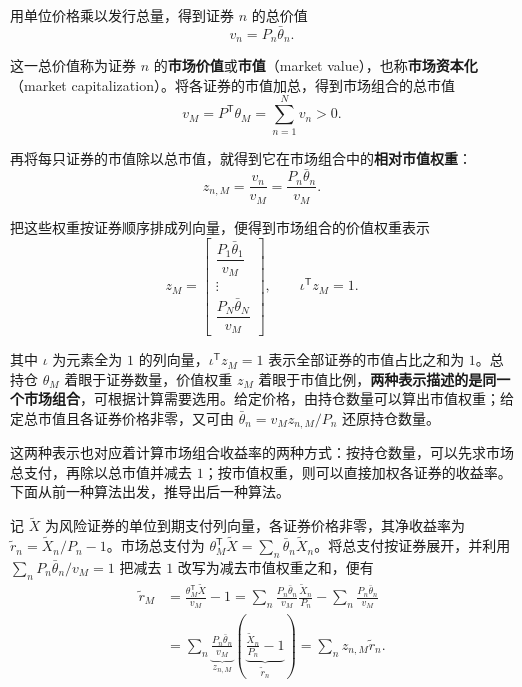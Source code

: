 \begin{tcolorbox}[knowledge]
用单位价格乘以发行总量，得到证券 $n$ 的总价值
\[
 v_n=P_n\bar\theta_n.
\]

这一总价值称为证券 $n$ 的\textbf{市场价值}或\textbf{市值}（market value），也称\textbf{市场资本化}（market capitalization）。将各证券的市值加总，得到市场组合的总市值
\[
 v_M=P^{\mathsf T}\theta_M=\sum_{n=1}^N v_n>0.
\]

再将每只证券的市值除以总市值，就得到它在市场组合中的\textbf{相对市值权重}：
\[
 z_{n,M}=\frac{v_n}{v_M}=\frac{P_n\bar\theta_n}{v_M}.
\]

把这些权重按证券顺序排成列向量，便得到市场组合的价值权重表示
\begin{equation}
 z_M=\begin{bmatrix}
 \dfrac{P_1\bar\theta_1}{v_M}\\[4pt]
 \vdots\\[2pt]
 \dfrac{P_N\bar\theta_N}{v_M}
 \end{bmatrix},\qquad \iota^{\mathsf T}z_M=1.
 \label{eq:wj-13-2}
\end{equation}
\end{tcolorbox}

其中 $\iota$ 为元素全为 $1$ 的列向量，$\iota^{\mathsf T}z_M=1$ 表示全部证券的市值占比之和为 $1$。总持仓 $\theta_M$ 着眼于证券数量，价值权重 $z_M$ 着眼于市值比例，\textbf{两种表示描述的是同一个市场组合}，可根据计算需要选用。给定价格，由持仓数量可以算出市值权重；给定总市值且各证券价格非零，又可由 $\bar\theta_n=v_Mz_{n,M}/P_n$ 还原持仓数量。

这两种表示也对应着计算市场组合收益率的两种方式：按持仓数量，可以先求市场总支付，再除以总市值并减去 $1$；按市值权重，则可以直接加权各证券的收益率。下面从前一种算法出发，推导出后一种算法。

记 $\widetilde X$ 为风险证券的单位到期支付列向量，各证券价格非零，其净收益率为 $\widetilde r_n=\widetilde X_n/P_n-1$。市场总支付为 $\theta_M^{\mathsf T}\widetilde X=\sum_n\bar\theta_n\widetilde X_n$。将总支付按证券展开，并利用 $\sum_n P_n\bar\theta_n/v_M=1$ 把减去 $1$ 改写为减去市值权重之和，便有
\[
 \begin{aligned}
 \widetilde r_M
 &=\frac{\theta_M^{\mathsf T}\widetilde X}{v_M}-1
 =\sum_n\frac{P_n\bar\theta_n}{v_M}\frac{\widetilde X_n}{P_n}
  -\sum_n\frac{P_n\bar\theta_n}{v_M}\\
 &=\sum_n \underbrace{\frac{P_n\bar\theta_n}{v_M}}_{z_{n,M}}
   \left(\underbrace{\frac{\widetilde X_n}{P_n}-1}_{\widetilde r_n}\right)
 =\sum_n z_{n,M}\widetilde r_n.
 \end{aligned}
\]

